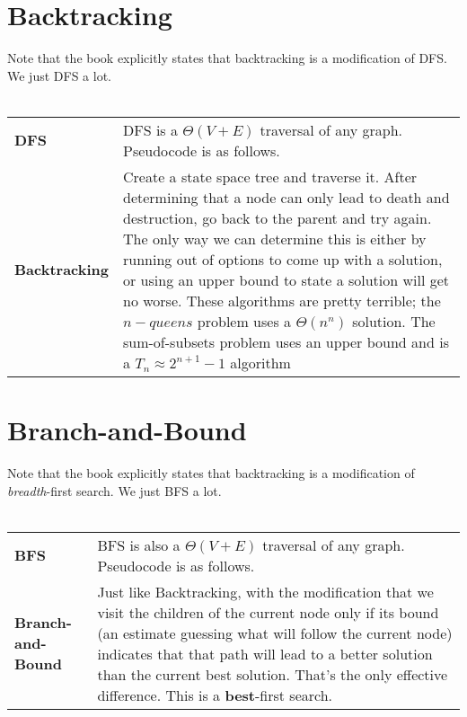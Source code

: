 \documentclass[aip, jmp, amsmath,amssymb, reprint]{revtex4-1}
\theoremstyle{definition}
\begin{document}
\section{Backtracking}
Note that the book explicitly states that backtracking is a modification of DFS. We just DFS a lot.\\\\
\begin{longtable}{p{2.2cm} p{5cm} }
    \textbf{DFS} & DFS is a $\Theta(V + E)$ traversal of any graph. Pseudocode is as follows.\\
    \textbf{Backtracking} & Create a state space tree and traverse it. After determining that a node can only lead to death and destruction, go back to the parent and try again. The only way we can determine this is either by running out of options to come up with a solution, or using an upper bound to state a solution will get no worse. These algorithms are pretty terrible; the $n-queens$ problem uses a $\Theta(n^n)$ solution. The sum-of-subsets problem uses an upper bound and is a $T_n \approx 2^{n+1}-1$ algorithm
\end{longtable}
\section{Branch-and-Bound}
Note that the book explicitly states that backtracking is a modification of \textit{breadth}-first search. We just BFS a lot.\\\\
\begin{longtable}{p{2.2cm} p{5cm} }
    \textbf{BFS} & BFS is also a  $\Theta(V + E)$ traversal of any graph. Pseudocode is as follows.\\
    \textbf{Branch-and-Bound} & Just like Backtracking, with the modification that we visit the children of the current node only if its bound (an estimate guessing what will follow the current node) indicates that that path will lead to a better solution than the current best solution. That's the only effective difference. This is a \textbf{best}-first search.
\end{longtable}
\end{document}
